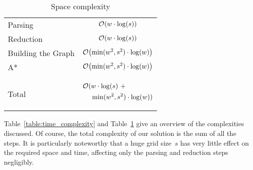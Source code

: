 \documentclass[sigconf,nonacm,screen]{acmart}
\begin{document}
\begin{table}[h]
    \centering
    \begin{tabular}{lc}
        \toprule
        Parsing            & $\mathcal{O}\hspace{-0.15em}\left(w\cdot\log(s)\right)$             \vphantom{${X^X_X}^X_X$}\vspace{1mm} \\
        Reduction          & $\mathcal{O}\hspace{-0.15em}\left(w\cdot\log(s)\right)$             \vphantom{${X^X_X}^X_X$}\vspace{1mm} \\
        Building the Graph & $\mathcal{O}\hspace{-0.15em}\left(\min(w^2,s^2)\cdot\log(w)\right)$ \vphantom{${X^X_X}^X_X$}\vspace{1mm} \\
        A*                 & $\mathcal{O}\hspace{-0.15em}\left(\min(w^2,s^2)\cdot\log(w)\right)$ \vphantom{${X^X_X}^X_X$}\vspace{1mm} \\
        \midrule
        \vspace{-5mm}\\
        Total
            &   \multicolumn{1}{c}{
                    \begin{minipage}{4cm}
                        \setlength{\jot}{0pt} %
                        \begin{align*}
                                \bigO\left(\right. &\hspace{-0.5mm} w\cdot\logs ~+           \\
                                                   &\hspace{-0.5mm} \min(w^2,s^2)\cdot\logw) \vphantom{\underset{X}{X}}
                        \end{align*}
                    \end{minipage}
                }
            \\
        \bottomrule
    \end{tabular}
    \caption{Space complexity}
    \label{table:space_complexity}
    \vspace{-5mm}
\end{table}

Table~\ref{table:time_complexity} and Table~\ref{table:space_complexity} give an overview of the complexities discussed. Of course, the total complexity of our solution is the sum of all the steps. It is particularly noteworthy that a huge grid size~$s$ has very little effect on the required space and time, affecting only the parsing and reduction steps negligibly. 
\end{document}

